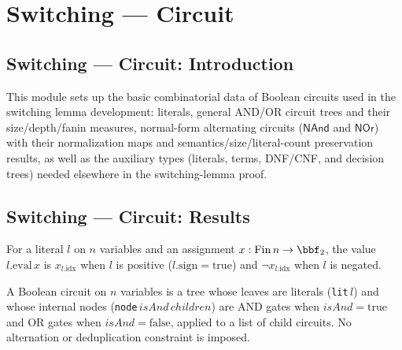 \section{Switching --- Circuit}
\subsection*{Switching --- Circuit: Introduction}
This module sets up the basic combinatorial data of Boolean circuits used in the
switching lemma development: literals, general AND/OR circuit trees and their
size/depth/fanin measures, normal-form alternating circuits ($\mathsf{NAnd}$ and
$\mathsf{NOr}$) with their normalization maps and semantics/size/literal-count
preservation results, as well as the auxiliary types (literals, terms, DNF/CNF, and
decision trees) needed elsewhere in the switching-lemma proof.

\subsection*{Switching --- Circuit: Results}

\begin{definition}
\label{BoolCircuit.Lit.eval}
\leanok
{}
For a literal $l$ on $n$ variables and an assignment $x : \mathrm{Fin}\,n \to \bbf_2$,
the value $l.\mathrm{eval}\,x$ is $x_{l.\mathrm{idx}}$ when $l$ is positive
($l.\mathrm{sign} = \mathrm{true}$) and $\lnot x_{l.\mathrm{idx}}$ when $l$ is negated.
\end{definition}

\begin{definition}
\label{BoolCircuit.TreeCircuit}
\leanok
{}
A Boolean circuit on $n$ variables is a tree whose leaves are literals
(\texttt{lit}\,$l$) and whose internal nodes (\texttt{node}\,$isAnd$\,$children$) are
AND gates when $isAnd = \mathrm{true}$ and OR gates when $isAnd = \mathrm{false}$,
applied to a list of child circuits. No alternation or deduplication constraint is
imposed.
\end{definition}

